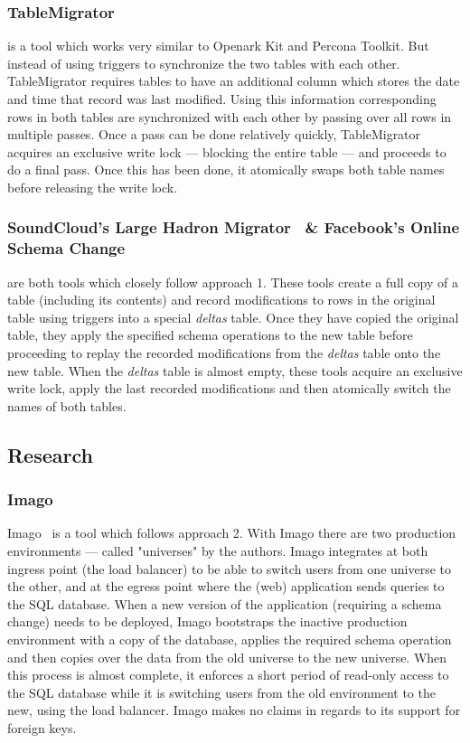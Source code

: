\documentclass[conference]{IEEEtran}
\begin{document}
\subsubsection{TableMigrator~\cite{TableMigrator}}
is a tool which works very similar to Openark Kit and Percona Toolkit. But instead of using triggers to synchronize the two tables with each other. TableMigrator requires tables to have an additional column which stores the date and time that record was last modified. Using this information corresponding rows in both tables are synchronized with each other by passing over all rows in multiple passes. Once a pass can be done relatively quickly, TableMigrator acquires an exclusive write lock --- blocking the entire table --- and proceeds to do a final pass. Once this has been done, it atomically swaps both table names before releasing the write lock.

\subsubsection{SoundCloud's Large Hadron Migrator~\cite{SoundcloudLHM} \& Facebook's Online Schema Change~\cite{FacebookOSC}}
are both tools which closely follow approach 1. These tools create a full copy of a table (including its contents) and record modifications to rows in the original table using triggers into a special \textit{deltas} table. Once they have copied the original table, they apply the specified schema operations to the new table before proceeding to replay the recorded modifications from the \textit{deltas} table onto the new table. When the \textit{deltas} table is almost empty, these tools acquire an exclusive write lock, apply the last recorded modifications and then atomically switch the names of both tables.

\subsection{Research}

\subsubsection{Imago}
Imago~\cite{Dumitras:2009:WUF:1656980.1657005} is a tool which follows approach 2. With Imago there are two production environments --- called "universes" by the authors. Imago integrates at both ingress point (the load balancer) to be able to switch users from one universe to the other, and at the egress point where the (web) application sends queries to the SQL database. When a new version of the application (requiring a schema change) needs to be deployed, Imago bootstraps the inactive production environment with a copy of the database, applies the required schema operation and then copies over the data from the old universe to the new universe. When this process is almost complete, it enforces a short period of read-only access to the SQL database while it is switching users from the old environment to the new, using the load balancer. Imago makes no claims in regards to its support for foreign keys.
\end{document}
